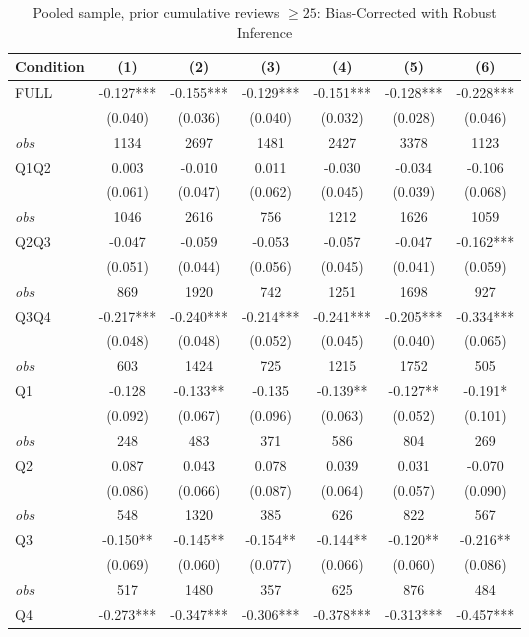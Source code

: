 \begin{table}[!htbp]
\centering
\caption{Pooled sample, prior cumulative reviews $\geq25$: Bias-Corrected with Robust Inference}
\begin{tabular}{lcccccc}
\toprule
Condition & (1) & (2) & (3) & (4) & (5) & (6) \\
\midrule
FULL & -0.127*** & -0.155*** & -0.129*** & -0.151*** & -0.128*** & -0.228*** \\
 & (0.040) & (0.036) & (0.040) & (0.032) & (0.028) & (0.046) \\
\textit{obs} & 1134 & 2697 & 1481 & 2427 & 3378 & 1123 \\
Q1Q2 & 0.003 & -0.010 & 0.011 & -0.030 & -0.034 & -0.106 \\
 & (0.061) & (0.047) & (0.062) & (0.045) & (0.039) & (0.068) \\
\textit{obs} & 1046 & 2616 & 756 & 1212 & 1626 & 1059 \\
Q2Q3 & -0.047 & -0.059 & -0.053 & -0.057 & -0.047 & -0.162*** \\
 & (0.051) & (0.044) & (0.056) & (0.045) & (0.041) & (0.059) \\
\textit{obs} & 869 & 1920 & 742 & 1251 & 1698 & 927 \\
Q3Q4 & -0.217*** & -0.240*** & -0.214*** & -0.241*** & -0.205*** & -0.334*** \\
 & (0.048) & (0.048) & (0.052) & (0.045) & (0.040) & (0.065) \\
\textit{obs} & 603 & 1424 & 725 & 1215 & 1752 & 505 \\
Q1 & -0.128 & -0.133** & -0.135 & -0.139** & -0.127** & -0.191* \\
 & (0.092) & (0.067) & (0.096) & (0.063) & (0.052) & (0.101) \\
\textit{obs} & 248 & 483 & 371 & 586 & 804 & 269 \\
Q2 & 0.087 & 0.043 & 0.078 & 0.039 & 0.031 & -0.070 \\
 & (0.086) & (0.066) & (0.087) & (0.064) & (0.057) & (0.090) \\
\textit{obs} & 548 & 1320 & 385 & 626 & 822 & 567 \\
Q3 & -0.150** & -0.145** & -0.154** & -0.144** & -0.120** & -0.216** \\
 & (0.069) & (0.060) & (0.077) & (0.066) & (0.060) & (0.086) \\
\textit{obs} & 517 & 1480 & 357 & 625 & 876 & 484 \\
Q4 & -0.273*** & -0.347*** & -0.306*** & -0.378*** & -0.313*** & -0.457*** \\

\end{tabular}
\end{table}
